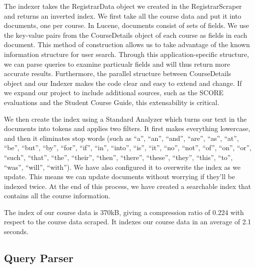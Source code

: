 \documentclass[12pt,letterpaper]{article}
\begin{document}
The indexer takes the RegistrarData object we created in the RegistrarScraper and returns an inverted index. We first take all the course data and put it into documents, one per course. In Lucene, documents consist of sets of fields. We use the key-value pairs from the CourseDetails object of each course as fields in each document. This method of construction allows us to take advantage of the known information structure for user search. Through this application-specific structure, we can parse queries to examine particualr fields and will thus return more accurate results. Furthermore, the parallel structure between CourseDetails object and our Indexer makes the code clear and easy to extend and change. If we expand our project to include additional sources, such as the SCORE evaluations and the Student Course Guide, this extensability is critical. 

We then create the index using a Standard Analyzer which turns our text in the documents into tokens and applies two filters. It first makes everything lowercase, and then it eliminates stop words (such as ``a'', ``an'',  ``and'', ``are'', ``as'', ``at'', ``be'', ``but'', ``by'', ``for'', ``if'', ``in'', ``into'', ``is'', ``it'', ``no'', ``not'', ``of'', ``on'', ``or'', ``such'', ``that'', ``the'', ``their'', ``then'', ``there'', ``these'', ``they'', ``this'', ``to'', ``was'', ``will'', ``with''). We have also configured it to overwrite the index as we update. This means we can update documents without worrying if they'll be indexed twice. At the end of this process, we have created a searchable index that contains all the course information. 

The index of our course data is 370kB, giving a compression ratio of 0.224 with respect to the course data scraped. It indexes our course data in an average of 2.1 seconds. 
	
\subsection{Query Parser}
	
\end{document}
